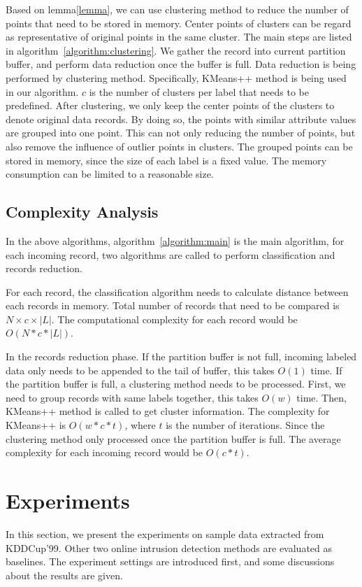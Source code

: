 \documentclass[runningheads]{llncs}
\begin{document}
	Based on lemma\ref{lemma}, we can use clustering method to reduce the number of points that need to be stored in memory. Center points of clusters can be regard as representative of original points in the same cluster. The main steps are listed in algorithm~\ref{algorithm:clustering}. We gather the record into current partition buffer, and perform data reduction once the buffer is full. Data reduction is being performed by clustering method. Specifically, KMeans++\cite{Nguyen1991} method is being used in our algorithm. $c$ is the number of clusters per label that needs to be predefined. After clustering, we only keep the center points of the clusters to denote original data records. By doing so, the points with similar attribute values are grouped into one point. This can not only reducing the number of points, but also remove the influence of outlier points in clusters. The grouped points can be stored in memory, since the size of each label is a fixed value. The memory consumption can be limited to a reasonable size. 
	
	\subsection{Complexity Analysis}
	
	In the above algorithms, algorithm~\ref{algorithm:main} is the main algorithm, for each incoming record, two algorithms are called to perform classification and records reduction.
	
	For each record, the classification algorithm needs to calculate distance between each records in memory. Total number of records that need to be compared is $N \times c \times |L|$. The computational complexity for each record would be $O(N*c*|L|)$.
	
	In the records reduction phase. If the partition buffer is not full, incoming labeled data only needs to be appended to the tail of buffer, this takes $O(1)$ time. If the partition buffer is full, a clustering method needs to be processed. First, we need to group records with same labels together, this takes $O(w)$ time. Then, KMeans++ method is called to get cluster information. The complexity for KMeans++ is $O(w*c*t)$, where $t$ is the number of iterations. Since the clustering method only processed once the partition buffer is full. The average complexity for each incoming record would be $O(c*t)$.
	
	\section{Experiments} \label{Experiments}
	In this section, we present the experiments on sample data extracted from KDDCup'99. Other two online intrusion detection methods are evaluated as baselines. The experiment settings are introduced first, and some discussions about the results are given.
	
\end{document}
